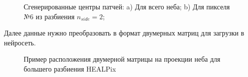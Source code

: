 \begin{figure}[h]
	\begin{minipage}[h]{0.44\linewidth}
	\end{minipage}
	\begin{minipage}[h]{0.44\linewidth}
	\end{minipage}

	\caption{Сгенерированные центры патчей: a) Для всего неба; 
b) Для пикселя №6 из разбиения $n_{side}=2$;}
\end{figure}

Далее данные нужно преобразовать в формат двумерных матриц для загрузки в нейросеть. \\

\begin{figure}[h]
	\caption{Пример расположения двумерной матрицы на проекции неба для большего разбиения HEALPix}
\end{figure}
